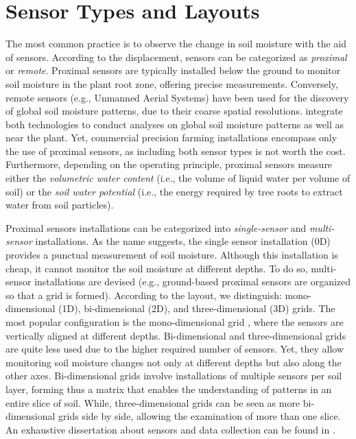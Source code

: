 \section{Sensor Types and Layouts}
\label{orchard-ssec:sensors}

The most common practice is to observe the change in soil moisture with the aid of sensors.
According to the displacement, sensors can be categorized as \textit{proximal} or \textit{remote}.
Proximal sensors are typically installed below the ground to monitor soil moisture in the plant root zone, offering precise measurements.
Conversely, remote sensors (e.g., Unmanned Aerial Systems) have been used for the discovery of global soil moisture patterns, due to their coarse spatial resolutions.
\cite{Babaeian2021} integrate both technologies to conduct analyses on global soil moisture patterns as well as near the plant.
Yet, commercial precision farming installations encompass only the use of proximal sensors, as including both sensor types is not worth the cost.
Furthermore, depending on the operating principle, proximal sensors measure either the \textit{volumetric water content} (i.e., the volume of liquid water per volume of soil) or the \textit{soil water potential} (i.e., the energy required by tree roots to extract water from soil particles).


Proximal sensors installations can be categorized into \textit{single-sensor} and \textit{multi-sensor} installations.
As the name suggests, the single sensor installation (0D) provides a punctual measurement of soil moisture.
Although this installation \cite{arif2013estimation} is cheap, it cannot monitor the soil moisture at different depths.
To do so, multi-sensor installations are devised (e.g., ground-based proximal sensors are organized so that a grid is formed).
According to the layout, we distinguish: mono-dimensional (1D), bi-dimensional (2D), and three-dimensional (3D) grids.
The most popular configuration is the mono-dimensional grid \cite{Karandish2016892, Goldstein2018421, Jimenez20201327, Pan2021, Li20152382}, where the sensors are vertically aligned at different depths.
Bi-dimensional \cite{Egea2016197, Cordeiro2016139} and three-dimensional \cite{Zapata-Sierra2021, Liang2021} grids are quite less used due to the higher required number of sensors.
Yet, they allow monitoring soil moisture changes not only at different depths but also along the other axes.
Bi-dimensional grids involve installations of multiple sensors per soil layer, forming thus a matrix that enables the understanding of patterns in an entire slice of soil.
While, three-dimensional grids can be seen as more bi-dimensional grids side by side, allowing the examination of more than one slice.
An exhaustive dissertation about sensors and data collection can be found in \cite{vitali2021crop}.

